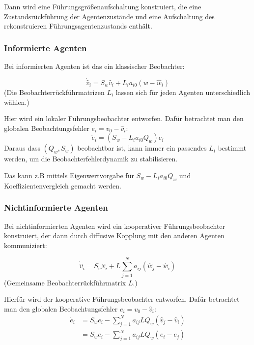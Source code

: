 Dann wird eine Führungsgrößenaufschaltung konstruiert, die eine Zustandsrückführung
der Agentenzustände und eine Aufschaltung des rekonstruieren
Führungsagentenzustands enthält.


\subsubsection{Informierte Agenten}

Bei informierten Agenten ist das ein klassischer Beobachter:

\begin{equation}
    \dot{\hat{v}}_i = S_w \hat{v}_i + L_i a_{i0} (w-\hat{w}_i)
\end{equation}
(Die Beobachterrückführmatrizen $L_i$ lassen sich für jeden Agenten
unterschiedlich wählen.)


Hier wird ein lokaler Führungsbeobachter entworfen.
Dafür betrachtet man den globalen Beobachtungsfehler $e_i = v_0 - \hat{v}_i$:
\begin{equation}
    \dot{e}_i = (S_w - L_i a_{i0} Q_w) e_i
\end{equation}
Daraus dass $(Q_w, S_w)$ beobachtbar ist, kann immer ein passendes $L_i$ bestimmt werden,
um die Beobachterfehlerdynamik zu stabilisieren.

Das kann z.B mittels Eigenwertvorgabe für $S_w - L_i a_{i0} Q_w$ und
Koeffizientenvergleich gemacht werden.

\subsubsection{Nichtinformierte Agenten}

Bei nichtinformierten Agenten wird ein kooperativer Führungsbeobachter konstruiert,
der dann durch diffusive Kopplung mit den anderen Agenten kommuniziert:

\begin{equation}
    \dot{\hat{v}}_i = S_w \hat{v}_i + L \sum_{j=1}^N a_{ij} (\hat{w}_j - \hat{w}_i)
\end{equation}
(Gemeinsame Beobachterrückführmatrix $L$.)

Hierfür wird der kooperative Führungsbeobachter entworfen.
Dafür betrachtet man den globalen Beobachtungsfehler $e_i = v_0 - \hat{v}_i$:
\begin{align}
    \dot{e}_i &= S_w e_i - \sum_{j=1}^N a_{ij} L Q_w (\hat{v}_j - \hat{v}_i) \\
    &= S_w e_i - \sum_{j=1}^N a_{ij} L Q_w (e_i - e_j)
\end{align}

